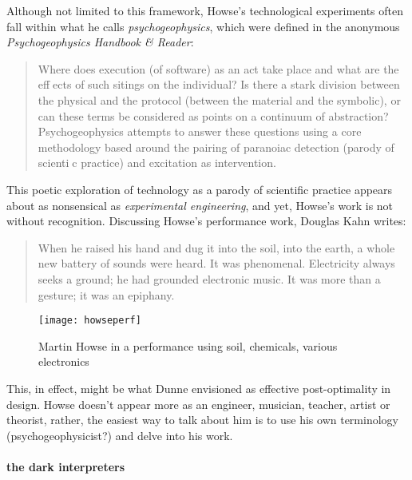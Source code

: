 Although not limited to this framework, Howse's technological experiments often fall within what he calls \emph{psychogeophysics}, which were defined in the anonymous \emph{Psychogeophysics Handbook & Reader}: 

\begin{quote}
	
	Where does execution (of software) as an act take place and what are the eff􏰇ects of such sitings on the individual? Is there a stark division between the physical and the protocol (between the material and the symbolic), or can these terms be considered as points on a continuum of abstraction? Psychogeophysics attempts to answer these questions using a core methodology based around the pairing of paranoiac detection (parody of scienti􏰁c practice) and excitation as intervention.
	
	\end{quote}
	
	\citep{anonymous2011}
	
This poetic exploration of technology as a parody of scientific practice appears about as nonsensical as \emph{experimental engineering}, and yet, Howse's work is not without recognition. Discussing Howse's performance work, Douglas Kahn writes: 
	
\begin{quote}

When he raised his hand and dug it into the soil, into the earth, a whole new battery of sounds were heard. It was phenomenal. Electricity always seeks a ground; he had grounded electronic music. It was more than a gesture; it was an epiphany.
\end{quote}

\citep{kahn2014}

	\begin{figure}[h!]
	  \caption{Martin Howse in a performance using soil, chemicals, various electronics}
	  \centering
	    \texttt{[image: howseperf]}
	\end{figure}

This, in effect, might be what Dunne envisioned as effective post-optimality in design. Howse doesn't appear more as an engineer, musician, teacher, artist or theorist, rather, the easiest way to talk about him is to use his own terminology (psychogeophysicist?) and delve into his work.  

\paragraph{the dark interpreters}

